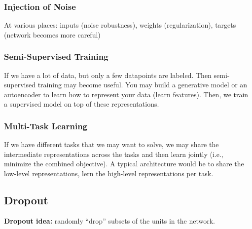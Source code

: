 \documentclass[a2paper,4pt]{extarticle}
\begin{document}
\begin{landscape}
\begin{multicols*}{7}
\subsubsection{Injection of Noise}

At various places: inputs (noise robustness), weights (regularization), targets
(network becomes more careful)

\subsubsection{Semi-Supervised Training}

If we have a lot of data, but only a few datapoints are labeled. Then
semi-supervised training may become useful. You may build a generative model or
an autoencoder to learn how to represent your data (learn features). Then, we
train a supervised model on top of these representations.

\subsubsection{Multi-Task Learning}

If we have different tasks that we may want to solve, we may share the
intermediate representations across the tasks and then learn jointly (i.e.,
minimize the combined objective). A typical architecture would be to share the
low-level representations, lern the high-level representations per task.

\subsection{Dropout}

\textbf{Dropout idea:} randomly ``drop'' subsets of the units in the network.


\end{multicols*}
\end{landscape}
\end{document}
